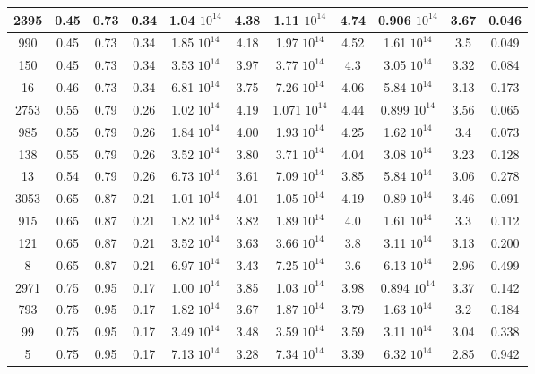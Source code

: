 \begin{table*}
\begin{tabular}{|c|c|c|c|c|c|c|c|c|c|c|}
          \hline 
          2395   & 0.45   & 0.73   & 0.34   & 1.04 $10^{14}$   & 4.38   & 1.11 $10^{14}$   & 4.74   & 0.906 $10^{14}$   & 3.67    & 0.046   \\
          \hline 
          990   & 0.45   & 0.73   & 0.34   & 1.85 $10^{14}$   & 4.18   & 1.97 $10^{14}$   & 4.52   & 1.61 $10^{14}$   & 3.5    & 0.049   \\
          \hline 
          150   & 0.45   & 0.73   & 0.34   & 3.53 $10^{14}$   & 3.97   & 3.77 $10^{14}$   & 4.3   & 3.05 $10^{14}$   & 3.32    & 0.084  \\ 
          \hline 
          16   & 0.46   & 0.73   & 0.34   & 6.81 $10^{14}$   & 3.75   & 7.26 $10^{14}$   & 4.06   & 5.84 $10^{14}$   & 3.13    & 0.173   \\
          \hline 
          2753   & 0.55   & 0.79   & 0.26   & 1.02 $10^{14}$   & 4.19   & 1.071 $10^{14}$   & 4.44   & 0.899 $10^{14}$   & 3.56    & 0.065  \\ 
          \hline 
          985   & 0.55   & 0.79   & 0.26   & 1.84 $10^{14}$   & 4.00   & 1.93 $10^{14}$   & 4.25   & 1.62 $10^{14}$   & 3.4    & 0.073 \\  
          \hline 
          138   & 0.55   & 0.79   & 0.26   & 3.52 $10^{14}$   & 3.80   & 3.71 $10^{14}$   & 4.04   & 3.08 $10^{14}$   & 3.23    & 0.128   \\
          \hline 
          13   & 0.54   & 0.79   & 0.26   & 6.73 $10^{14}$   & 3.61   & 7.09 $10^{14}$   & 3.85   & 5.84 $10^{14}$   & 3.06    & 0.278  \\ 
          \hline 
          3053   & 0.65   & 0.87   & 0.21   & 1.01 $10^{14}$   & 4.01   & 1.05 $10^{14}$   & 4.19   & 0.89 $10^{14}$   & 3.46    & 0.091  \\ 
          \hline 
          915   & 0.65   & 0.87   & 0.21   & 1.82 $10^{14}$   & 3.82   & 1.89 $10^{14}$   & 4.0   & 1.61 $10^{14}$   & 3.3    & 0.112   \\
          \hline 
          121   & 0.65   & 0.87   & 0.21   & 3.52 $10^{14}$   & 3.63   & 3.66 $10^{14}$   & 3.8   & 3.11 $10^{14}$   & 3.13    & 0.200  \\ 
          \hline 
          8   & 0.65   & 0.87   & 0.21   & 6.97 $10^{14}$   & 3.43   & 7.25 $10^{14}$   & 3.6   & 6.13 $10^{14}$   & 2.96    & 0.499  \\ 
          \hline 
          2971   & 0.75   & 0.95   & 0.17   & 1.00 $10^{14}$   & 3.85   & 1.03 $10^{14}$   & 3.98   & 0.894 $10^{14}$   & 3.37    & 0.142   \\
          \hline 
          793   & 0.75   & 0.95   & 0.17   & 1.82 $10^{14}$   & 3.67   & 1.87 $10^{14}$   & 3.79   & 1.63 $10^{14}$   & 3.2    & 0.184   \\
          \hline 
          99   & 0.75   & 0.95   & 0.17   & 3.49 $10^{14}$   & 3.48   & 3.59 $10^{14}$   & 3.59   & 3.11 $10^{14}$   & 3.04    & 0.338   \\
          \hline 
          5   & 0.75   & 0.95   & 0.17   & 7.13 $10^{14}$   & 3.28   & 7.34 $10^{14}$   & 3.39   & 6.32 $10^{14}$   & 2.85    & 0.942   \\
          \hline 


\end{tabular}
\end{table*}
